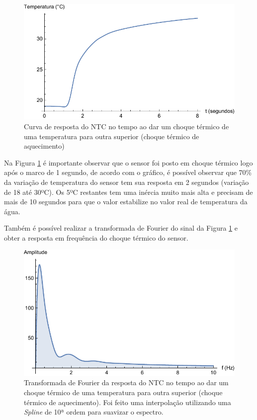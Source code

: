 \documentclass[a4paper]{instrumentacao}
\begin{document}
\begin{figure}[H]
\center
\includegraphics[width=\textwidth]{ThermalShock-Up-Time.pdf}
\caption{Curva de resposta do NTC no tempo ao dar um choque térmico de uma temperatura para outra superior (choque térmico de aquecimento)}
\label{fig:ntc-choque-acima-tempo}
\end{figure}

Na Figura \ref{fig:ntc-choque-acima-tempo} é importante observar que o sensor foi posto em choque térmico logo após o marco de 1 segundo, de acordo com o gráfico, é possível observar que 70\% da variação de temperatura do sensor tem sua resposta em 2 segundos (variação de 18 até 30ºC). Os 5ºC restantes tem uma inércia muito mais alta e precisam de mais de 10 segundos para que o valor estabilize no valor real de temperatura da água.

Também é possível realizar a transformada de Fourier do sinal da Figura \ref{fig:ntc-choque-acima-tempo} e obter a resposta em frequência do choque térmico do sensor.

\begin{figure}[H]
\center
\includegraphics[width=\textwidth]{ThermalShock-Up-Frequency.pdf}
\caption{Transformada de Fourier da resposta do NTC no tempo ao dar um choque térmico de uma temperatura para outra superior (choque térmico de aquecimento). Foi feito uma interpolação utilizando uma \textit{Spline} de 10ª ordem para suavizar o espectro.}
\label{fig:ntc-choque-acima-frequencia}
\end{figure}
\end{document}
